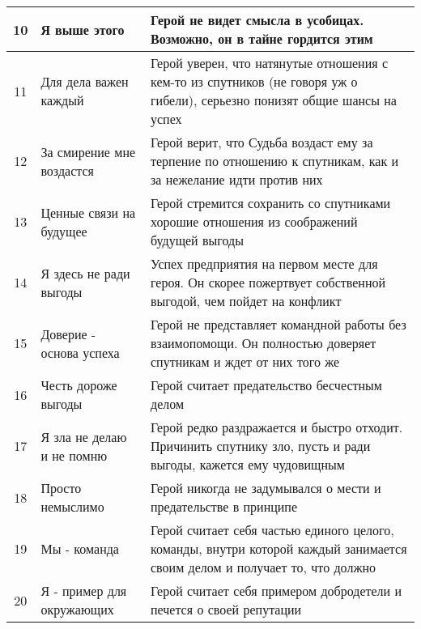\begin{center}
\begin{tabular}{ |c|p{4cm}|p{10cm}| }
10 & Я выше этого & Герой не видет смысла в усобицах. Возможно, он в тайне гордится этим \\ \hline
11 & Для дела важен каждый & Герой уверен, что натянутые отношения с кем-то из спутников (не говоря уж о гибели), серьезно понизят общие шансы на успех \\ \hline
12 & За смирение мне воздастся & Герой верит, что Судьба воздаст ему за терпение по отношению к спутникам, как и за нежелание идти против них \\ \hline
13 & Ценные связи на будущее & Герой стремится сохранить со спутниками хорошие отношения из соображений будущей выгоды \\ \hline
14 & Я здесь не ради выгоды & Успех предприятия на первом месте для героя. Он скорее пожертвует собственной выгодой, чем пойдет на конфликт \\ \hline
15 & Доверие - основа успеха & Герой не представляет командной работы без взаимопомощи. Он полностью доверяет спутникам и ждет от них того же \\ \hline
16 & Честь дороже выгоды & Герой считает предательство бесчестным делом \\ \hline
17 & Я зла не делаю и не помню & Герой редко раздражается и быстро отходит. Причинить спутнику зло, пусть и ради выгоды, кажется ему чудовищным \\ \hline
18 & Просто немыслимо & Герой никогда не задумывался о мести и предательстве в принципе \\ \hline
19 & Мы - команда & Герой считает себя частью единого целого, команды, внутри которой каждый занимается своим делом и получает то, что должно \\ \hline
20 & Я - пример для окружающих & Герой считает себя примером добродетели и печется о своей репутации \\ \hline
\end{tabular}
\end{center}